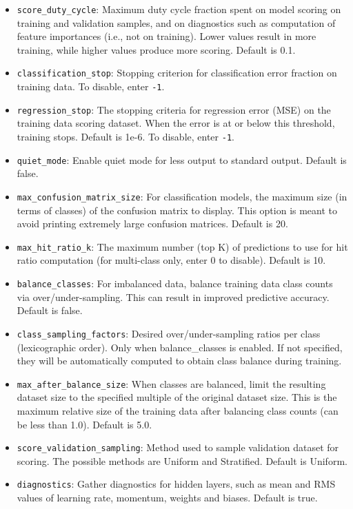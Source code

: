 \documentclass{article}[11pt]
\begin{document}
\begin{itemize}
\item \texttt{score\_duty\_cycle}: Maximum duty cycle fraction spent on model scoring on training and validation samples, and on diagnostics such as computation of feature importances (i.e., not on training). Lower values result in more training, while higher values produce more scoring. Default is 0.1.
\item \texttt{classification\_stop}: Stopping criterion for classification error fraction on training data. To disable, enter \texttt{-1}. 
\item \texttt{regression\_stop}: The stopping criteria for regression error (MSE) on the training data scoring dataset. When the error is at or below this threshold, training stops. Default is 1e-6. To disable, enter \texttt{-1}. 
\item \texttt{quiet\_mode}: Enable quiet mode for less output to standard output. Default is false.
\item \texttt{max\_confusion\_matrix\_size}: For classification models, the maximum size (in terms of classes) of the confusion matrix to display. This option is meant to avoid printing extremely large confusion matrices. Default is 20.
\item \texttt{max\_hit\_ratio\_k}: The maximum number (top K) of predictions to use for hit ratio computation (for multi-class only, enter 0 to disable). Default is 10.
\item \texttt{balance\_classes}: For imbalanced data, balance training data class counts via over/under-sampling. This can result in improved predictive accuracy. Default is false.
\item \texttt{class\_sampling\_factors}: Desired over/under-sampling ratios per class (lexicographic order). Only when balance\_classes is enabled. If not specified, they will be automatically computed to obtain class balance during training.
\item \texttt{max\_after\_balance\_size}: When classes are balanced, limit the resulting dataset size to the specified multiple of the original dataset size. This is the maximum relative size of the training data after balancing class counts (can be less than 1.0). Default is 5.0.
\item \texttt{score\_validation\_sampling}: Method used to sample validation dataset for scoring. The possible methods are Uniform and Stratified. Default is Uniform.
\item \texttt{diagnostics}: Gather diagnostics for hidden layers, such as mean and RMS values of learning rate, momentum, weights and biases. Default is true.

\end{itemize}
\end{document}
